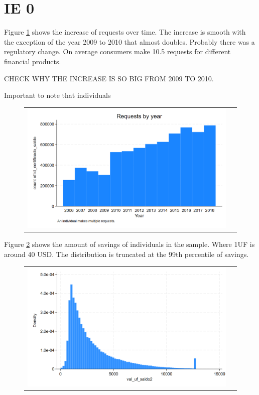 \documentclass[12pt]{article}
\begin{document}






\section{IE 0}

Figure \ref{fig:ie0_0} shows the increase of requests over time. The increase is smooth with the exception of the year 2009 to 2010 that almost doubles. Probably there was a regulatory change. 
On average consumers make 10.5 requests for different financial products. 

CHECK WHY THE INCREASE IS SO BIG FROM 2009 TO 2010.

Important to note that individuals 
\begin{figure}[H]
\caption{}
\label{fig:ie0_0}
\centering{}%
\begin{tabular}{cc}
\includegraphics[scale=0.27]{figures/IE0_plot0.png}
\end{tabular}
\end{figure}


Figure \ref{fig:ie0_1} shows the amount of savings of individuals in the sample. Where 1UF is around 40 USD. The distribution is truncated at the 99th percentile of savings. 


\begin{figure}[H]
\caption{}
\label{fig:ie0_1}
\centering{}%
\begin{tabular}{cc}
\includegraphics[scale=0.27]{figures/IE0_plot1.png} 
\end{tabular}
\end{figure}
\end{document}
